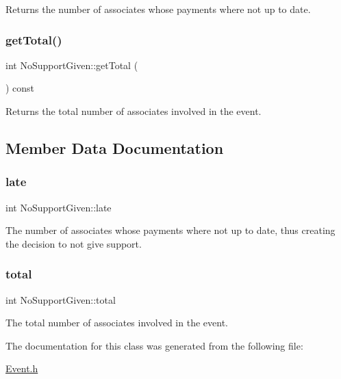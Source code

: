 Returns the number of associates whose payments where not up to date. 

\mbox{\label{classNoSupportGiven_a2888ed870de8146fc4ee15c84edf5530}} 
\subsubsection{\texorpdfstring{get\+Total()}{getTotal()}}
{\footnotesize\ttfamily int No\+Support\+Given\+::get\+Total (\begin{DoxyParamCaption}{ }\end{DoxyParamCaption}) const\hspace{0.3cm}{\ttfamily [inline]}}



Returns the total number of associates involved in the event. 



\subsection{Member Data Documentation}
\mbox{\label{classNoSupportGiven_a4f1413a35ad22fe50bc1d5dc08414784}} 
\subsubsection{\texorpdfstring{late}{late}}
{\footnotesize\ttfamily int No\+Support\+Given\+::late\hspace{0.3cm}{\ttfamily [private]}}



The number of associates whose payments where not up to date, thus creating the decision to not give support. 

\mbox{\label{classNoSupportGiven_ab70919acf20a32d05a2b6b4d8753dcb5}} 
\subsubsection{\texorpdfstring{total}{total}}
{\footnotesize\ttfamily int No\+Support\+Given\+::total\hspace{0.3cm}{\ttfamily [private]}}



The total number of associates involved in the event. 



The documentation for this class was generated from the following file\+:\begin{DoxyCompactItemize}
\item 
\hyperlink{Event_8h}{Event.\+h}\end{DoxyCompactItemize}

